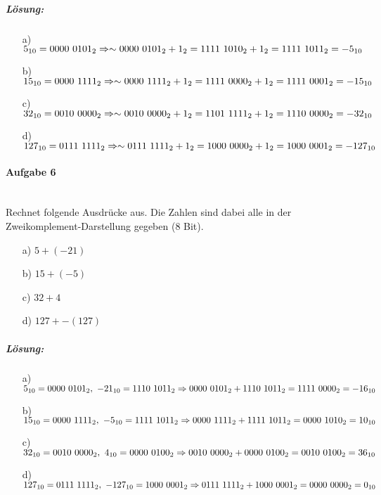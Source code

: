 \documentclass[12pt,a4paper,ngerman]{scrartcl}
\begin{document}
	\subparagraph{Lösung:} 
	\begin{itemize}
		\item[a)] $5_{10} = 0000\ 0101_2\\
			\Rightarrow \sim 0000\ 0101_2 + 1_2 = 1111\ 1010_2 + 1_2 = 1111\ 1011_2 = -5_{10}$
		\item[b)] $15_{10} = 0000\ 1111_2\\
			\Rightarrow \sim 0000\ 1111_2 + 1_2 = 1111\ 0000_2 + 1_2 = 1111\ 0001_2 = -15_{10}$
		\item[c)] $32_{10} = 0010\ 0000_2\\
			\Rightarrow \sim 0010\ 0000_2 + 1_2 = 1101\ 1111_2 + 1_2 = 1110\ 0000_2 = -32_{10}$
		\item[d)] $127_{10} = 0111\ 1111_2\\
			\Rightarrow \sim 0111\ 1111_2 + 1_2 = 1000\ 0000_2 + 1_2 = 1000\ 0001_2 = -127_{10}$
	\end{itemize}

	\paragraph{Aufgabe 6}\mbox{}\\
	Rechnet folgende Ausdrücke aus. Die Zahlen sind dabei alle in der Zweikomplement-Darstellung gegeben (8 Bit).
	\begin{itemize}
		\item[a)] $5 + (-21)$
		\item[b)] $15 + (-5)$
		\item[c)] $32 + 4$
		\item[d)] $127 + -(127)$
	\end{itemize}
	
	\subparagraph{Lösung:} 
	\begin{itemize}
		\item[a)] $5_{10} = 0000\ 0101_2,\ -21_{10} = 1110\ 1011_2\\
			\Rightarrow 0000\ 0101_2 + 1110\ 1011_2 = 1111\ 0000_2 = -16_{10}$
		\item[b)] $15_{10} = 0000\ 1111_2,\ -5_{10} = 1111\ 1011_2\\
			\Rightarrow 0000\ 1111_2 + 1111\ 1011_2 = 0000\ 1010_2 = 10_{10}$
		\item[c)] $32_{10} = 0010\ 0000_2,\ 4_{10} = 0000\ 0100_2\\
			\Rightarrow 0010\ 0000_2 + 0000\ 0100_2 = 0010\ 0100_2 = 36_{10}$
		\item[d)] $127_{10} = 0111\ 1111_2,\ -127_{10} = 1000\ 0001_2\\
			\Rightarrow 0111\ 1111_2 + 1000\ 0001_2 = 0000\ 0000_2 = 0_{10}$
	\end{itemize}
	
\end{document}
